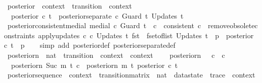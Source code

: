 \begin{isabellebody}
\endisatagproof
{\isafoldproof}%
%
\isadelimproof
\isanewline
%
\endisadelimproof
\isanewline
{}\isamarkupfalse%
\ posterior\ {\isacharcolon}{\isacharcolon}\ {\isachardoublequoteopen}context\ {\isasymRightarrow}\ transition\ {\isasymRightarrow}\ context{\isachardoublequoteclose}\ \isanewline
\ \ {\isachardoublequoteopen}posterior\ c\ t\ {\isacharequal}\ posterior{\isacharunderscore}separate\ c\ {\isacharparenleft}Guard\ t{\isacharparenright}\ {\isacharparenleft}Updates\ t{\isacharparenright}{\isachardoublequoteclose}\isanewline
\isanewline
{}\isamarkupfalse%
\ posterior{\isacharunderscore}consistent{\isacharunderscore}medial{\isacharcolon}\ {\isachardoublequoteopen}medial\ c\ {\isacharparenleft}Guard\ t{\isacharparenright}\ {\isacharequal}\ c{\isacharprime}\ {\isasymLongrightarrow}\ consistent\ c{\isacharprime}\ {\isasymLongrightarrow}\ remove{\isacharunderscore}obsolete{\isacharunderscore}constraints\ {\isacharparenleft}apply{\isacharunderscore}updates\ c{\isacharprime}\ c\ {\isacharparenleft}Updates\ t{\isacharparenright}{\isacharparenright}\ {\isacharparenleft}fst\ {\isacharbar}{\isacharbackquote}{\isacharbar}\ fset{\isacharunderscore}of{\isacharunderscore}list\ {\isacharparenleft}Updates\ t{\isacharparenright}{\isacharparenright}\ {\isacharequal}\ p\ {\isasymLongrightarrow}\ posterior\ c\ t\ {\isacharequal}\ p{\isachardoublequoteclose}\isanewline
%
\isadelimproof
\ \ %
\endisadelimproof
%
\isatagproof
{}\isamarkupfalse%
\ {\isacharparenleft}simp\ add{\isacharcolon}\ posterior{\isacharunderscore}def\ posterior{\isacharunderscore}separate{\isacharunderscore}def{\isacharparenright}%
\endisatagproof
{\isafoldproof}%
%
\isadelimproof
\isanewline
%
\endisadelimproof
\isanewline
{}\isamarkupfalse%
\ posterior{\isacharunderscore}n\ {\isacharcolon}{\isacharcolon}\ {\isachardoublequoteopen}nat\ {\isasymRightarrow}\ transition\ {\isasymRightarrow}\ context\ {\isasymRightarrow}\ context{\isachardoublequoteclose}\ \ \isanewline
\ \ {\isachardoublequoteopen}posterior{\isacharunderscore}n\ {}\ {\isacharunderscore}\ c\ {\isacharequal}\ c\ {\isachardoublequoteclose}\ {\isacharbar}\isanewline
\ \ {\isachardoublequoteopen}posterior{\isacharunderscore}n\ {\isacharparenleft}Suc\ m{\isacharparenright}\ t\ c\ {\isacharequal}\ posterior{\isacharunderscore}n\ m\ t\ {\isacharparenleft}posterior\ c\ t{\isacharparenright}{\isachardoublequoteclose}\isanewline
\isanewline
{}\isamarkupfalse%
\ posterior{\isacharunderscore}sequence\ {\isacharcolon}{\isacharcolon}\ {\isachardoublequoteopen}context\ {\isasymRightarrow}\ transition{\isacharunderscore}matrix\ {\isasymRightarrow}\ nat\ {\isasymRightarrow}\ datastate\ {\isasymRightarrow}\ trace\ {\isasymRightarrow}\ context{\isachardoublequoteclose}\ \isanewline

\end{isabellebody}
